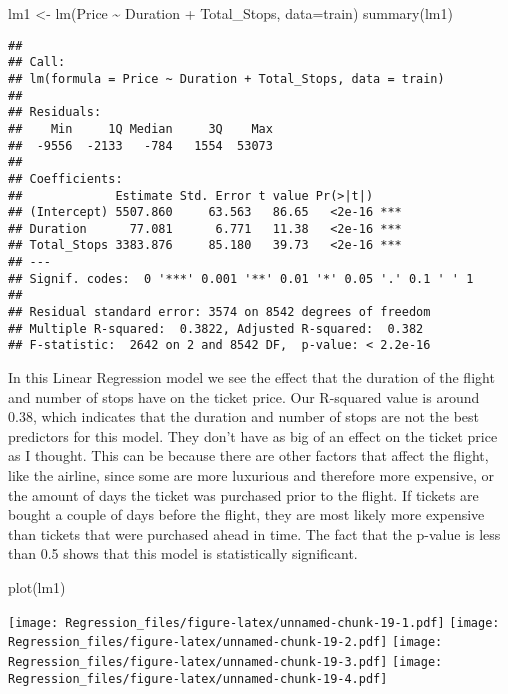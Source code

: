 \documentclass[
]{article}
\newenvironment{Shaded}{\begin{snugshade}}{\end{snugshade}}
\newcommand{\AttributeTok}[1]{\textcolor[rgb]{0.77,0.63,0.00}{#1}}
\newcommand{\FunctionTok}[1]{\textcolor[rgb]{0.00,0.00,0.00}{#1}}
\newcommand{\NormalTok}[1]{#1}
\newcommand{\OtherTok}[1]{\textcolor[rgb]{0.56,0.35,0.01}{#1}}
\newcommand{\SpecialCharTok}[1]{\textcolor[rgb]{0.00,0.00,0.00}{#1}}
\begin{document}
\begin{Shaded}
\begin{Highlighting}[]
\NormalTok{lm1 }\OtherTok{\textless{}{-}} \FunctionTok{lm}\NormalTok{(Price }\SpecialCharTok{\textasciitilde{}}\NormalTok{ Duration }\SpecialCharTok{+}\NormalTok{ Total\_Stops, }\AttributeTok{data=}\NormalTok{train)}
\FunctionTok{summary}\NormalTok{(lm1)}
\end{Highlighting}
\end{Shaded}

\begin{verbatim}
## 
## Call:
## lm(formula = Price ~ Duration + Total_Stops, data = train)
## 
## Residuals:
##    Min     1Q Median     3Q    Max 
##  -9556  -2133   -784   1554  53073 
## 
## Coefficients:
##             Estimate Std. Error t value Pr(>|t|)    
## (Intercept) 5507.860     63.563   86.65   <2e-16 ***
## Duration      77.081      6.771   11.38   <2e-16 ***
## Total_Stops 3383.876     85.180   39.73   <2e-16 ***
## ---
## Signif. codes:  0 '***' 0.001 '**' 0.01 '*' 0.05 '.' 0.1 ' ' 1
## 
## Residual standard error: 3574 on 8542 degrees of freedom
## Multiple R-squared:  0.3822, Adjusted R-squared:  0.382 
## F-statistic:  2642 on 2 and 8542 DF,  p-value: < 2.2e-16
\end{verbatim}

In this Linear Regression model we see the effect that the duration of
the flight and number of stops have on the ticket price. Our R-squared
value is around 0.38, which indicates that the duration and number of
stops are not the best predictors for this model. They don't have as big
of an effect on the ticket price as I thought. This can be because there
are other factors that affect the flight, like the airline, since some
are more luxurious and therefore more expensive, or the amount of days
the ticket was purchased prior to the flight. If tickets are bought a
couple of days before the flight, they are most likely more expensive
than tickets that were purchased ahead in time. The fact that the
p-value is less than 0.5 shows that this model is statistically
significant.

\begin{Shaded}
\begin{Highlighting}[]
\FunctionTok{plot}\NormalTok{(lm1)}
\end{Highlighting}
\end{Shaded}

\texttt{[image: Regression\_files/figure-latex/unnamed-chunk-19-1.pdf]}
\texttt{[image: Regression\_files/figure-latex/unnamed-chunk-19-2.pdf]}
\texttt{[image: Regression\_files/figure-latex/unnamed-chunk-19-3.pdf]}
\texttt{[image: Regression\_files/figure-latex/unnamed-chunk-19-4.pdf]}
\end{document}
